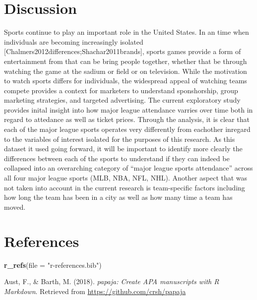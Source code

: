 \documentclass[man, fleqn, noextraspace,floatsintext]{apa6}
\newenvironment{Shaded}{\begin{snugshade}}{\end{snugshade}}
\newcommand{\KeywordTok}[1]{\textcolor[rgb]{0.13,0.29,0.53}{\textbf{#1}}}
\newcommand{\DataTypeTok}[1]{\textcolor[rgb]{0.13,0.29,0.53}{#1}}
\newcommand{\StringTok}[1]{\textcolor[rgb]{0.31,0.60,0.02}{#1}}
\newcommand{\NormalTok}[1]{#1}
\begin{document}
\section{Discussion}\label{discussion}

Sports continue to play an important role in the United States. In an
time when individuals are becoming increasingly isolated
{[}Chalmers2012differences;Shachar2011brands{]}, sports games provide a
form of entertainment from that can be bring people together, whether
that be through watching the game at the sadium or field or on
television. While the motivation to watch sports differs for
individuals, the widespread appeal of watching teams compete provides a
context for marketers to understand sponshorship, group marketing
strategies, and targeted advertising. The current exploratory study
provides inital insight into how major league attendance varries over
time both in regard to attedance as well as ticket prices. Through the
analysis, it is clear that each of the major league sports operates very
differently from eachother inregard to the variables of interest
isolated for the purposes of this research. As this dataset it used
going forward, it will be important to identify more clearly the
differences between each of the sports to understand if they can indeed
be collapsed into an overarching category of \enquote{major league
sports attendance} across all four major league sports (MLB, NBA, NFL,
NHL). Another aspect that was not taken into account in the current
research is team-specific factors including how long the team has been
in a city as well as how many time a team has moved.

\newpage

\section{References}\label{references}

\begin{Shaded}
\begin{Highlighting}[]
\KeywordTok{r_refs}\NormalTok{(}\DataTypeTok{file =} \StringTok{"r-references.bib"}\NormalTok{)}
\end{Highlighting}
\end{Shaded}

\begingroup
\setlength{\parindent}{-0.5in} \setlength{\leftskip}{0.5in}

\hypertarget{refs}{}
\hypertarget{ref-R-papaja}{}
Aust, F., \& Barth, M. (2018). \emph{papaja: Create APA manuscripts with
R Markdown}. Retrieved from \url{https://github.com/crsh/papaja}
\end{document}
